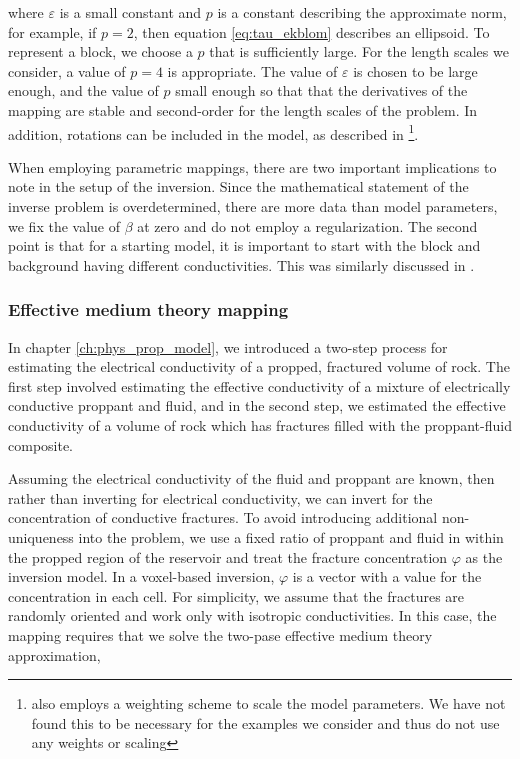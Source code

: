 
where $\varepsilon$ is a small constant and $p$ is a constant describing the approximate norm, for example, if $p=2$, then equation \ref{eq:tau_ekblom} describes an ellipsoid. To represent a block, we choose a $p$ that is sufficiently large. For the length scales we consider, a value of $p=4$ is appropriate. The value of $\varepsilon$ is chosen to be large enough, and the value of $p$ small enough so that that the derivatives of the mapping are stable and second-order for the length scales of the problem. In addition, rotations can be included in the model, as described in \cite{Mcmillan2017} \footnote{\cite{Mcmillan2017} also employs a weighting scheme to scale the model parameters. We have not found this to be necessary for the examples we consider and thus do not use any weights or scaling}.

When employing parametric mappings, there are two important implications to note in the setup of the inversion. Since the mathematical statement of the inverse problem is overdetermined, there are more data than model parameters, we fix the value of $\beta$ at zero and do not employ a regularization. The second point is that for a starting model, it is important to start with the block and background having different conductivities. This was similarly discussed in \cite{Mcmillan2017}.

\subsubsection{Effective medium theory mapping}

In chapter \ref{ch:phys_prop_model}, we introduced a two-step process for estimating the electrical conductivity of a propped, fractured volume of rock. The first step involved estimating the effective conductivity of a mixture of electrically conductive proppant and fluid, and in the second step, we estimated the effective conductivity of a volume of rock which has fractures filled with the proppant-fluid composite.

Assuming the electrical conductivity of the fluid and proppant are known, then rather than inverting for electrical conductivity, we can invert for the concentration of conductive fractures. To avoid introducing additional non-uniqueness into the problem, we use a fixed ratio of proppant and fluid in within the propped region of the reservoir and treat the fracture concentration $\varphi$ as the inversion model. In a voxel-based inversion, $\varphi$ is a vector with a value for the concentration in each cell. For simplicity, we assume that the fractures are randomly oriented and work only with isotropic conductivities. In this case, the mapping requires that we solve the two-pase effective medium theory approximation,

